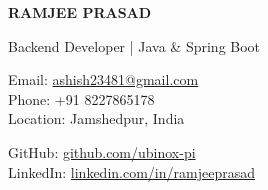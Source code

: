 \documentclass[a4paper,10pt]{article}
\begin{document}
\noindent
\hspace*{-0.4in}%
\colorbox{headerBg}{%
\parbox{\dimexpr\paperwidth-2\fboxsep-0.01in}{%
\hspace{0.4in}%
\begin{minipage}{\dimexpr\textwidth-0.1in}
\vspace{1.6em}
\textcolor{headerText}{\fontsize{22pt}{26pt}\selectfont\textbf{RAMJEE PRASAD}}

\vspace{0.5em}
\textcolor{headerGray}{\large Backend Developer | Java \& Spring Boot}

\vspace{1.4em}
\begin{minipage}[t]{0.48\textwidth}
{\small\textcolor{headerGray}{%
Email: \href{mailto:ashish23481@gmail.com}{\textcolor{headerGray}{ashish23481@gmail.com}}\\[0.4em]
Phone: +91 8227865178\\[0.4em]
Location: Jamshedpur, India
}}
\end{minipage}%
\hfill
\begin{minipage}[t]{0.48\textwidth}
{\small\textcolor{headerGray}{%
GitHub: \href{https://github.com/ubinox-pi}{\textcolor{headerGray}{github.com/ubinox-pi}}\\[0.4em]
LinkedIn: \href{https://www.linkedin.com/in/ramjeeprasad}{\textcolor{headerGray}{linkedin.com/in/ramjeeprasad}}
}}
\end{minipage}
\vspace{1.6em}
\end{minipage}%
}}

\vspace{0.6em}

\end{document}
